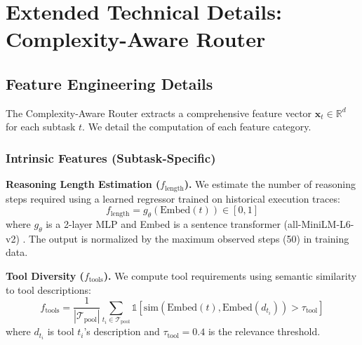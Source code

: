 \documentclass{article}
\theoremstyle{plain}
\theoremstyle{definition}
\theoremstyle{remark}
\begin{document}

%
%
%
%


\section{Extended Technical Details: Complexity-Aware Router}
\label{sec:car_extended}

\subsection{Feature Engineering Details}
\label{sec:car_features}

The Complexity-Aware Router extracts a comprehensive feature vector $\mathbf{x}_t \in \mathbb{R}^{d}$ for each subtask $t$. We detail the computation of each feature category.

\subsubsection{Intrinsic Features (Subtask-Specific)}

\textbf{Reasoning Length Estimation ($f_{\text{length}}$).} We estimate the number of reasoning steps required using a learned regressor trained on historical execution traces:
\begin{equation}
	f_{\text{length}} = g_\theta(\text{Embed}(t)) \in [0, 1]
\end{equation}
where $g_\theta$ is a 2-layer MLP and Embed is a sentence transformer (all-MiniLM-L6-v2) \citep{safarov2025hyperspectral}. The output is normalized by the maximum observed steps (50) in training data.

\textbf{Tool Diversity ($f_{\text{tools}}$).} We compute tool requirements using semantic similarity to tool descriptions:
\begin{equation}
	f_{\text{tools}} = \frac{1}{|\mathcal{T}_{\text{pool}}|} \sum_{t_i \in \mathcal{T}_{\text{pool}}} \mathbb{1}[\text{sim}(\text{Embed}(t), \text{Embed}(d_{t_i})) > \tau_{\text{tool}}]
\end{equation}
where $d_{t_i}$ is tool $t_i$'s description and $\tau_{\text{tool}} = 0.4$ is the relevance threshold.
\end{document}
